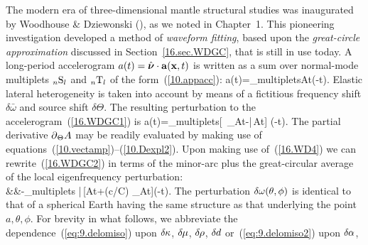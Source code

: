 The modern era of three-dimensional mantle structural
studies was inaugurated by Woodhouse \& Dziewonski
(\citeyear{woodhouse&dziewonski84}), as we noted
in Chapter~1.  This pioneering investigation developed
a method of {\em waveform fitting\/}, based
%
upon the {\em great-circle approximation\/} discussed
%
%
in Section~\ref{16.sec.WDGC}, that is still in use today.
A long-period accelerogram $a(t)=\mbox{$\hat{\mbox{\boldmath $\bf \nu$}}$}\cdot\mbox{${\bf a}$}(\mbox{${\bf x}$},t)$
is written as a sum over
normal-mode multiplets ${}_n{\rm S}_l$ and ${}_n{\rm T}_l$
of the form~(\ref{10.appacc}):
\eq \label{16.WDGC1}
a(t)=\sum_{\rm multiplets}\hspace{-3.0 mm}A\cos\om t\exp(-\gamma t).
\en
Elastic lateral heterogeneity is taken into account by means
of a fictitious frequency shift $\delta\bar{\omega}$ and source
shift $\delta\Theta$.  The resulting perturbation to
the accelerogram~(\ref{16.WDGC1}) is
\eq \label{16.WDGC2}
\delta a(t)=\sum_{\rm multiplets}\hspace{-3.0 mm}[\delta\Theta\,
\p_{\Theta}A\cos\om t-\delta\bar{\omega}\,A\sin\om t]
\exp(-\gamma t).
\en
The partial derivative $\mbox{$\partial$}_{\Theta}A$ may be
readily evaluated by making use of
equations~(\ref{10.vectamp})--(\ref{10.Dexpl2}).
Upon making use of~(\ref{16.WD4}) we can rewrite~(\ref{16.WDGC2})
in terms of the minor-arc plus the great-circular average
of the local eigenfrequency perturbation:
\eqa \label{16.WDGC3}  \nonumber \\
&&\mbox{}-\sum_{\rm multiplets}\hspace{-3.0 mm}
\delta\bar{\omega}\,[A\sin\om t+(c/C\hspace{0.3 mm}\om)
\p_{\Theta}A\cos\om t]\exp(-\gamma t).
\ena
The perturbation $\delta\mbox{$\omega$}(\theta,\phi)$ is identical
to that of a spherical Earth having the same structure
as that underlying the point $a,\theta,\phi$.  For brevity
in what follows, we abbreviate the dependence~(\ref{eq:9.delomiso})
upon $\delta\hspace{-0.1 mm}\kappa$, $\delta\hspace{-0.2 mm}\mu$,
$\delta\hspace{-0.2 mm}\rho$, $\delta\hspace{-0.1 mm}d$
or~(\ref{eq:9.delomiso2}) upon $\delta\hspace{-0.1 mm}\alpha$,
